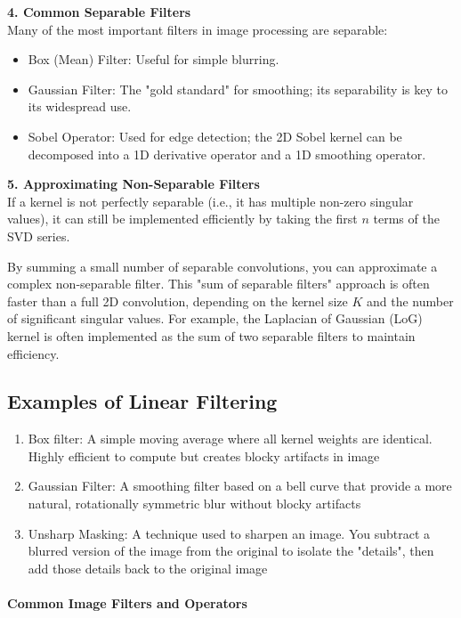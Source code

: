 \documentclass[12pt]{article}
\begin{document}
\textbf{4. Common Separable Filters} \\
Many of the most important filters in image processing are separable:
\begin{itemize}
    \item Box (Mean) Filter: Useful for simple blurring.
    \item Gaussian Filter: The "gold standard" for smoothing; its separability is key to its widespread use.
    \item Sobel Operator: Used for edge detection; the 2D Sobel kernel can be decomposed into a 1D derivative operator and a 1D smoothing operator.
\end{itemize}

\textbf{5. Approximating Non-Separable Filters} \\
If a kernel is not perfectly separable (i.e., it has multiple non-zero singular values), it can still be implemented efficiently by taking the first $n$ terms of the SVD series.

By summing a small number of separable convolutions, you can approximate a complex non-separable filter. This "sum of separable filters" approach is often faster than a full 2D convolution, depending on the kernel size $K$ and the number of significant singular values. For example, the Laplacian of Gaussian (LoG) kernel is often implemented as the sum of two separable filters to maintain efficiency.

\subsection{Examples of Linear Filtering}

\begin{enumerate}
    \item Box filter: A simple moving average where all kernel weights are identical. Highly efficient to compute but creates blocky artifacts in image
    \item Gaussian Filter: A smoothing filter based on a bell curve that provide a more natural, rotationally symmetric blur without blocky artifacts
    \item Unsharp Masking: A technique used to sharpen an image. You subtract a blurred version of the image from the original to isolate the "details", then add those details back to the original image
\end{enumerate}

\paragraph{Common Image Filters and Operators}
\end{document}
